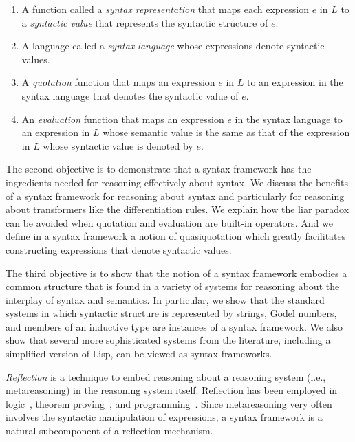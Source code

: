 \documentclass[11pt,fleqn]{article}
\newcommand{\be}{\begin{enumerate}}
\newcommand{\ee}{\end{enumerate}}
\begin{document}
\be

  \item A function called a \emph{syntax representation} that maps
    each expression $e$ in $L$ to a \emph{syntactic value} that
    represents the syntactic structure of $e$.

  \item A language called a \emph{syntax language} whose expressions
    denote syntactic values.  

  \item A \emph{quotation} function that maps an expression $e$ in $L$
    to an expression in the syntax language that denotes the syntactic
    value of $e$.

  \item An \emph{evaluation} function that maps an expression $e$ in
    the syntax language to an expression in $L$ whose semantic value
    is the same as that of the expression in $L$ whose syntactic value
    is denoted by $e$.

\ee

The second objective is to demonstrate that a syntax framework has the
ingredients needed for reasoning effectively about syntax.  We discuss
the benefits of a syntax framework for reasoning about syntax and
particularly for reasoning about transformers like the differentiation
rules.  We explain how the liar paradox can be avoided when quotation
and evaluation are built-in operators.  And we define in a syntax
framework a notion of quasiquotation which greatly facilitates
constructing expressions that denote syntactic values.

The third objective is to show that the notion of a syntax framework
embodies a common structure that is found in a variety of systems for
reasoning about the interplay of syntax and semantics.  In particular,
we show that the standard systems in which syntactic structure is
represented by strings, G\"odel numbers, and members of an inductive
type are instances of a syntax framework.  We also show that several
more sophisticated systems from the literature, including a simplified
version of Lisp, can be viewed as syntax frameworks.

\emph{Reflection} is a technique to embed reasoning about a reasoning
system (i.e., metareasoning) in the reasoning system itself.
Reflection has been employed in logic~\cite{Koellner09}, theorem
proving~\cite{Harrison95}, and programming~\cite{DemersMalenfant95}.
Since metareasoning very often involves the syntactic manipulation of
expressions, a syntax framework is a natural subcomponent of a
reflection mechanism.
\end{document}
